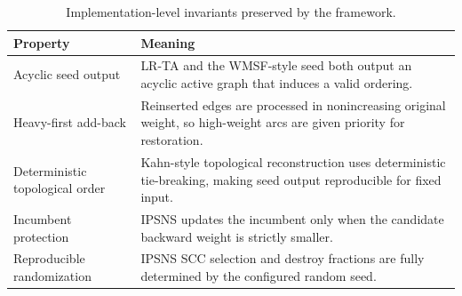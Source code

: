 \begin{table}[t]
\centering
\caption{Implementation-level invariants preserved by the framework.}
\label{tab:algorithm-invariants}
\begin{tabular}{>{\raggedright\arraybackslash}p{2.8cm} >{\raggedright\arraybackslash}p{9.2cm}}
\toprule
Property & Meaning \\
\midrule
Acyclic seed output & LR-TA and the WMSF-style seed both output an acyclic active graph that induces a valid ordering. \\
Heavy-first add-back & Reinserted edges are processed in nonincreasing original weight, so high-weight arcs are given priority for restoration. \\
Deterministic topological order & Kahn-style topological reconstruction uses deterministic tie-breaking, making seed output reproducible for fixed input. \\
Incumbent protection & IPSNS updates the incumbent only when the candidate backward weight is strictly smaller. \\
Reproducible randomization & IPSNS SCC selection and destroy fractions are fully determined by the configured random seed. \\
\bottomrule
\end{tabular}
\end{table}
